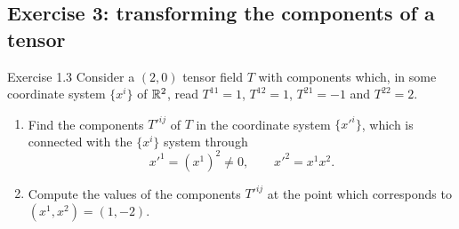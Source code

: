 \documentclass[11pt,a4paper]{article}
\numberwithin{equation}{subsection}
\begin{document}
\subsection{Exercise 3: transforming the components of a tensor}
\begin{problem}{Exercise 1.3}
Consider a $(2,0)$ tensor field $T$ with components which, in some coordinate system $\{x^i\}$ of $\mathbb{R}^2$, read $T^{11}=1$, $T^{12}=1$, $T^{21}=-1$ and $T^{22}=2$.
\begin{enumerate}[label=\alph*)]
\item Find the components $T'^{ij}$ of $T$ in the coordinate system $\{x'^i\}$, which is connected with the $\{x^i\}$ system through
\[
  x'^1=(x^1)^2\neq0,\qquad x'^2=x^1x^2 .
\]
\item Compute the values of the components $T'^{ij}$ at the point which corresponds to $(x^1,x^2)=(1,-2)$.
\end{enumerate}
\end{problem}
\end{document}
